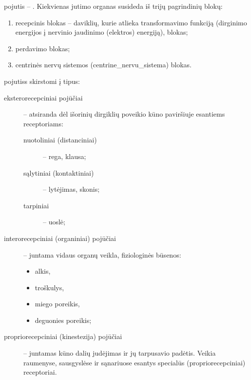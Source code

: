 \label{tema:pojuciai}

\Gls{pojutis} – . Kiekvienas jutimo organas
susideda iš trijų pagrindinių blokų:
\begin{enumerate}
  \item recepcinis blokas – daviklių, kurie atlieka transformavimo funkciją 
    (dirginimo energijos į nervinio jaudinimo (elektros) energiją), blokas;
  \item perdavimo blokas;
  \item centrinės nervų sistemos (\gls{centrine_nervu_sistema}) blokas.
\end{enumerate}

\Glspl{pojutis} skirstomi į tipus: 
\begin{description}
  \item[eksterorecepciniai pojūčiai] – atsiranda dėl išorinių dirgiklių
    poveikio kūno paviršiuje esantiems receptoriams:
    \begin{description}
      \item[nuotoliniai (distanciniai)] – rega, klausa;
      \item[sąlytiniai (kontaktiniai)] – lytėjimas, skonis;
      \item[tarpiniai] – uoslė;
    \end{description}
  \item[interorecepciniai (organiniai) pojūčiai] – juntama vidaus organų
    veikla, fiziologinės būsenos:
    \begin{itemize}
      \item alkis,
      \item troškulys,
      \item miego poreikis,
      \item deguonies poreikis;
    \end{itemize}
  \item[propriorecepciniai (\gls{kinestezija}) pojūčiai] – juntamas kūno
    dalių judėjimas ir jų tarpusavio padėtis. Veikia raumenyse, sausgyslėse
    ir sąnariuose esantys specialūs (propriorecepciniai) receptoriai.
\end{description}

